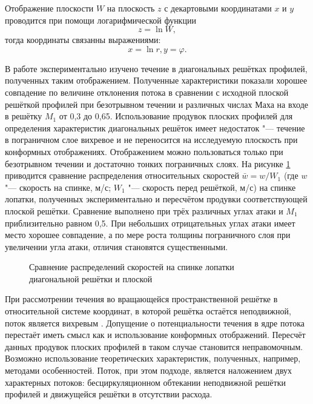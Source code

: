 Отображение плоскости \(W\) на плоскость \(z\) с декартовыми координатами \(x\) и \(y\) проводится при помощи логарифмической функции 
\begin{equation}
z = \ln W,
\end{equation}
тогда координаты связанны выражениями:
\begin{equation}
	x = \ln r, y = \varphi.
\end{equation}

 В работе \cite{Nikitin1966} экспериментально изучено течение в диагональных решётках профилей, полученных таким отображением. Полученные характеристики  показали хорошее совпадение по величине отклонения потока в сравнении с исходной плоской решёткой профилей при безотрывном течении и различных числах Маха на входе в решётку \(M_1\) от 0,3 до 0,65. Использование продувок плоских профилей для определения характеристик диагональных решёток имеет недостаток "--- течение в пограничном слое вихревое и не переносится на исследуемую плоскость при конформных отображениях. Отображением можно пользоваться только при безотрывном течении и достаточно тонких пограничных слоях. На рисунке \ref{fig:nikitin} приводится сравнение распределения относительных  скоростей \(\bar{w} = w/W_1\) (где \(w\) "--- скорость на спинке, м/с; \(W_1\) "--- скорость перед решёткой, м/с)  на спинке лопатки, полученных экспериментально и пересчётом продувки соответствующей плоской решётки. Сравнение выполнено при трёх различных углах атаки и \(M_1\) приблизительно равном 0,5. При небольших отрицательных углах атаки имеет место хорошее совпадение, а по мере роста толщины пограничного слоя при увеличении угла атаки, отличия становятся существенными.
 
 \begin{figure} [ht]
 	\centerfloat{
 		\\
 		\\
 		
 	}
 	\caption{Сравнение распределений скоростей на спинке лопатки диагональной решётки и плоской \cite{Nikitin1966}} 
 	\label{fig:nikitin}
 \end{figure}
 
При рассмотрении течения во вращающейся пространственной решётке в относительной системе координат, в которой решётка остаётся неподвижной, поток является вихревым \cite{Jukovskiy1967,Viktorov1969}. Допущение о потенциальности течения в ядре потока перестаёт иметь смысл как и использование конформных отображений. Пересчёт данных продувок плоских профилей в таком случае становится неправомочным. Возможно использование теоретических характеристик, полученных, например, методами особенностей. Поток, при этом подходе, является наложением двух характерных потоков: бесциркуляционном обтекании неподвижной решётки профилей и движущейся решётки в отсутствии расхода.
 
